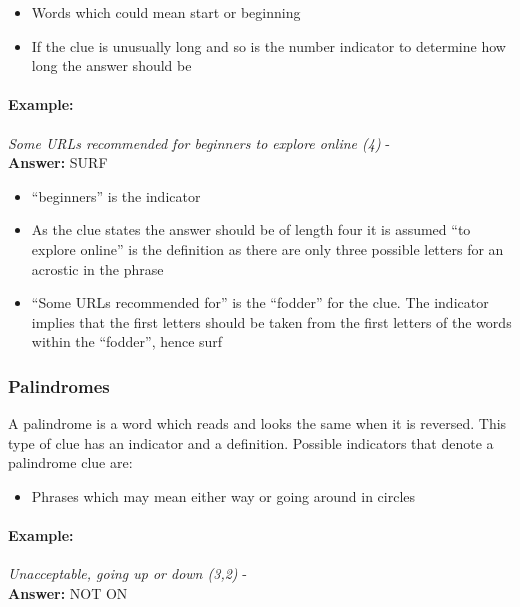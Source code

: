 \begin{itemize}
  \item Words which could mean start or beginning 
  \item If the clue is unusually long and so is the number indicator to 
        determine how long the answer should be 
\end{itemize}

\paragraph{Example:} \emph{Some URLs recommended for beginners to explore online (4)} - \citep{shuchiAcrostics08} \\
\textbf{Answer:} SURF 

\begin{itemize}
  \item ``beginners'' is the indicator 
  \item As the clue states the answer should be of length four it is assumed 
        ``to explore online'' is the definition as there are only three possible 
        letters for an acrostic in the phrase 
  \item ``Some URLs recommended for'' is the ``fodder'' for the clue. The 
        indicator implies that the first letters should be taken from the first 
        letters of the words within the ``fodder'', hence surf  
\end{itemize}


\subsubsection{Palindromes}

A palindrome is a word which reads and looks the same when it is reversed. This
type of clue has an indicator and a definition.  Possible indicators that denote
a palindrome clue are:

\begin{itemize} 
    \item Phrases which may mean either way or going around in circles
\end{itemize}

\paragraph{Example:} \emph{Unacceptable, going up or down (3,2)} - \citep{connorPalindromes12} \\
\textbf{Answer:} NOT ON 

